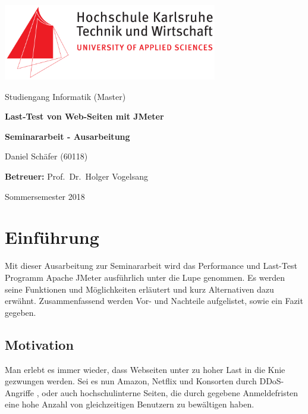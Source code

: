 \documentclass[a4paper,12pt]{article}
\author{Daniel Sch\"afer} \let\Author\@author
\begin{document}
\begin{titlepage}
	\centering
	\includegraphics[width=0.7\textwidth]{bilder/hskalogo}\par\vspace{1cm}
	\vspace{0.5cm}
	{\Large Studiengang Informatik (Master)}\par
	\vspace{2cm}
	{\huge\bfseries Last-Test von Web-Seiten mit JMeter}\par
	\vspace{2cm}
	{\Large\bfseries Seminararbeit - Ausarbeitung}\par
	\vspace{0.5cm}
	\vspace{3cm}
	
	{\Large Daniel Schäfer (60118)\par}
	\vspace{1cm}
	{\Large\textbf{Betreuer:} Prof.~Dr.~Holger Vogelsang} 
	\vfill
	{\Large Sommersemester 2018\par}
	\vfill
\end{titlepage}

\setcounter{page}{2}
\thispagestyle{empty} %
\tableofcontents
\pagebreak
\thispagestyle{empty}
\listoffigures
\pagebreak

\setcounter{page}{5}

\section{Einführung}
Mit dieser Ausarbeitung zur Seminararbeit wird das Performance und Last-Test Programm Apache JMeter ausführlich unter die Lupe genommen. Es werden seine Funktionen und Möglichkeiten erläutert und kurz Alternativen dazu erwähnt. Zusammenfassend werden Vor- und Nachteile aufgelistet, sowie ein Fazit gegeben.

\subsection{Motivation}
Man erlebt es immer wieder, dass Webseiten unter zu hoher Last in die Knie gezwungen werden. Sei es nun Amazon, Netflix und Konsorten durch DDoS-Angriffe \cite{online:AmazonDDoS}, oder auch hochschulinterne Seiten, die durch gegebene Anmeldefristen eine hohe Anzahl von gleichzeitigen Benutzern zu bewältigen haben. 
\end{document}
